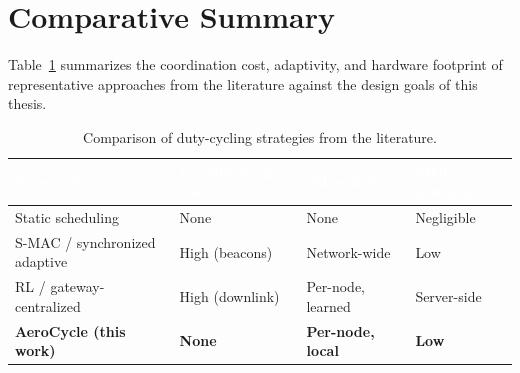 \section{Comparative Summary}
Table~\ref{tab:comparison} summarizes the coordination cost, adaptivity, and hardware
footprint of representative approaches from the literature against the design goals of this
thesis.

\begin{table}[H]
\centering
\caption{Comparison of duty-cycling strategies from the literature.}
\label{tab:comparison}
\begin{tabularx}{\textwidth}{@{}lXXX@{}}
\toprule
\rowcolor{nustgreen}
\textcolor{white}{\bfseries Approach} & \textcolor{white}{\bfseries Coordination cost} &
\textcolor{white}{\bfseries Adaptivity} & \textcolor{white}{\bfseries MCU footprint} \\
\midrule
Static scheduling            & None            & None            & Negligible \\
\rowcolor{nustmist}
S-MAC / synchronized adaptive & High (beacons)  & Network-wide     & Low \\
RL / gateway-centralized      & High (downlink) & Per-node, learned & Server-side \\
\rowcolor{nustmist}
\textbf{AeroCycle (this work)} & \textbf{None}   & \textbf{Per-node, local} & \textbf{Low} \\
\bottomrule
\end{tabularx}
\end{table}
